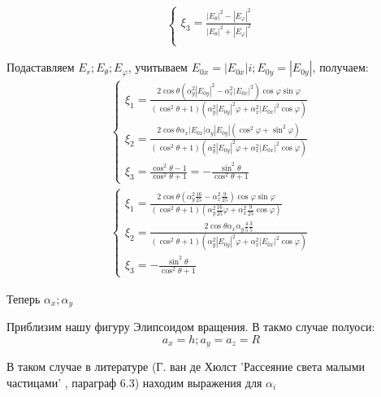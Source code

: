 \documentclass[12pt]{article}
\begin{document}
\begin{large}
\begin{eqnarray*}
\begin{cases}
        \xi_3 = \frac{|E_\theta|^2 - |E_\varphi|^2}{|E_\theta|^2 + |E_\varphi|^2} \\
    \end{cases}
\end{eqnarray*}
\par Подаставляем $E_r; E_\theta; E_\varphi$, учитываем $E_{0x} = |E_{0x}| i ; E_{0y} = |E_{0y}|$, получаем:
\begin{eqnarray*}
    \begin{cases}
        \xi_1 = \frac{2 \cos \theta \left( \alpha_y^2 |E_{0y}|^2 - \alpha_x^2 |E_{0x}|^2 \right) \cos \varphi \sin \varphi}{\left( \cos^2 \theta + 1 \right)\left( \alpha_y^2 |E_{0y}|^2 \varphi + \alpha_x^2 |E_{0x}|^2 \cos \varphi \right)} \\
        \xi_2 = \frac{2 \cos \theta \alpha_x |E_{0x}| \alpha_y |E_{0y}| \left( \cos^2 \varphi + \sin^2 \varphi \right)}{\left( \cos^2 \theta + 1 \right)\left( \alpha_y^2 |E_{0y}|^2 \varphi + \alpha_x^2 |E_{0x}|^2 \cos \varphi \right)} \\
        \xi_3 = \frac{\cos^2 \theta - 1}{\cos^2 \theta + 1} = - \frac{\sin^2 \theta}{\cos^2 \theta + 1}
    \end{cases}
\end{eqnarray*}
\begin{eqnarray*}
    \begin{cases}
        \xi_1 = \frac{2 \cos \theta \left( \alpha_y^2 \frac{16}{25} - \alpha_x^2 \frac{9}{25} \right) \cos \varphi \sin \varphi}{\left( \cos^2 \theta + 1 \right)\left( \alpha_y^2 \frac{16}{25} \varphi + \alpha_x^2 \frac{9}{25} \cos \varphi \right)} \\
        \xi_2 = \frac{2 \cos \theta \alpha_x \alpha_y \frac{4}{5} \frac{3}{5}}{\left( \cos^2 \theta + 1 \right)\left( \alpha_y^2 |E_{0y}|^2 \varphi + \alpha_x^2 |E_{0x}|^2 \cos \varphi \right)} \\
        \xi_3 = - \frac{\sin^2 \theta}{\cos^2 \theta + 1}
    \end{cases}
\end{eqnarray*}
\par Теперь $\alpha_x; \alpha_y$
\par Приблизим нашу фигуру Элипсоидом вращения. В такмо случае полуоси:
\[
    a_x = h; a_y = a_z = R
\]
\par В таком случае в литературе (Г. ван де Хюлст 'Рассеяние света малыми частицами' , параграф 6.3) находим выражения для $\alpha_i$
\par

\end{large}
\end{document}
